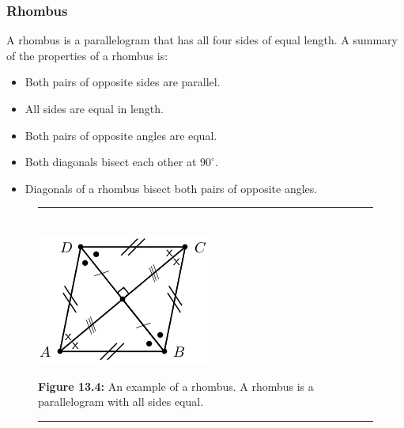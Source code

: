 \subsubsection{ Rhombus}
A rhombus is a parallelogram that has all four sides of equal length. A summary of the properties of a rhombus is:\par 
\begin{itemize}[noitemsep]
\item Both pairs of opposite sides are parallel.
\item All sides are equal in length.
\item Both pairs of opposite angles are equal.
\item Both diagonals bisect each other at ${90}^{\circ }$.
\item Diagonals of a rhombus bisect both pairs of opposite angles.
\end{itemize}
\setcounter{subfigure}{0}
\begin{figure}[H] %
\begin{center}
\rule[.1in]{\figurerulewidth}{.005in} \\
\label{m39354*uid75!!!underscore!!!media}\label{m39354*uid75!!!underscore!!!printimage}\includegraphics{col11306.imgs/m39354_MG10C13_043.png} %
\vspace{2pt}
\vspace{\rubberspace}\par \begin{cnxcaption}
\small \textbf{Figure 13.4: }An example of a rhombus. A rhombus is a parallelogram with all sides equal.
\end{cnxcaption}
\vspace{.1in}
\rule[.1in]{\figurerulewidth}{.005in} \\
\end{center}
\end{figure}       

